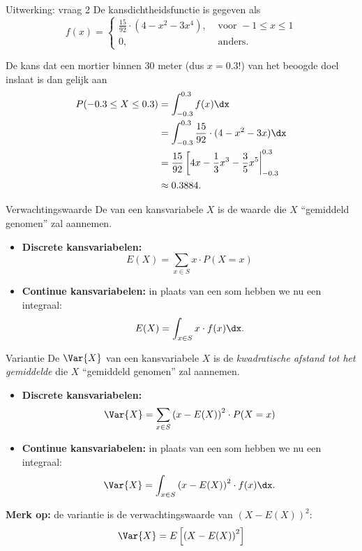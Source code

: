     \begin{frame}{Uitwerking: vraag 2}
        De kansdichtheidsfunctie is gegeven als 
        \[
            f(x) = \begin{cases}
                \frac{15}{92} \cdot (4 - x^2 - 3x^4), & \text{ voor } -1 \leq x \leq 1 \\
                0, & \text{ anders.}
            \end{cases}
        \]

        De kans dat een mortier binnen $30$ meter (dus $x = 0.3$!) van het beoogde doel inslaat is dan gelijk aan
        \begin{align*}
            P(-0.3 \leq X \leq 0.3) &= \int_{-0.3}^{0.3} f(x) \dx \\
                                    &= \int_{-0.3}^{0.3} \frac{15}{92} \cdot (4 - x^2 - 3x) \dx \\
                                    &= \frac{15}{92} \left[ 4x - \frac{1}{3}x^3 - \frac{3}{5}x^5 \right|_{-0.3}^{0.3} \\
                                    &\approx 0.3884.
        \end{align*}
    \end{frame}

    \begin{frame}{Verwachtingswaarde}
        De  van een kansvariabele $X$ is de waarde die $X$ \enquote{gemiddeld genomen}
        zal aannemen.
        \vfill\pause
        \begin{itemize}[<+->]\setlength\itemsep{1em}
            \item \textbf{Discrete kansvariabelen:} 
            \[
                E(X) = \sum_{x \in S} x \cdot P(X=x)
            \]
            \item \textbf{Continue kansvariabelen:} in plaats van een som hebben we nu een integraal:
            \[
                E(X) = \int_{x \in S} x \cdot f(x) \dx.
            \]
        \end{itemize}
    \end{frame}

    \begin{frame}{Variantie}
        De  $\Var{X}$ van een kansvariabele $X$ is de \emph{kwadratische afstand tot het gemiddelde} die $X$ \enquote{gemiddeld genomen}
        zal aannemen.
        \vfill\pause
        \begin{itemize}[<+->]\setlength\itemsep{1em}
            \item \textbf{Discrete kansvariabelen:} 
            \[
                \Var{X} = \sum_{x \in S} \left(x - E(X)\right)^2 \cdot P(X=x)
            \]
            \item \textbf{Continue kansvariabelen:} in plaats van een som hebben we nu een integraal:
            \[
                \Var{X} = \int_{x \in S} \left( x - E(X) \right)^2 \cdot f(x) \dx.
            \]
        \end{itemize}
        \vfill\pause
        \textbf{Merk op:} de variantie is de verwachtingswaarde van $\left(X - E(X)\right)^2$:
        \[
            \Var{X} = E\left[ \left(X - E(X)\right)^2\right]
        \]
    \end{frame}

